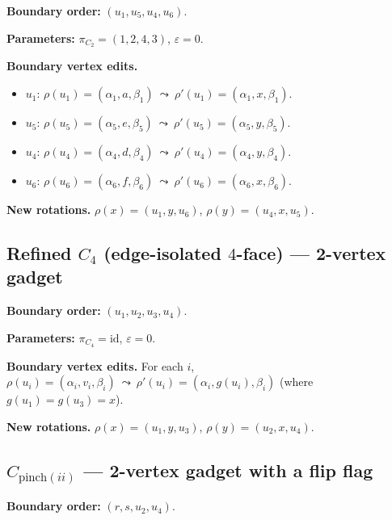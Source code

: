 \documentclass[12pt]{article}
\theoremstyle{definition}
\newcommand{\RefinedCFourGadgetVertices}{2}
\newcommand{\PinchGadgetVertices}{2}
\begin{document}
\noindent\textbf{Boundary order:} $(u_1, u_5, u_4, u_6)$.

\noindent\textbf{Parameters:} $\pi_{C_2} = (1, 2, 4, 3)$, $\varepsilon = 0$.

\medskip
\noindent\textbf{Boundary vertex edits.}
\begin{itemize}
  \item $u_1$: $\rho(u_1)=(\alpha_1, a, \beta_1)\ \leadsto\ \rho'(u_1)=(\alpha_1, x, \beta_1)$.
  \item $u_5$: $\rho(u_5)=(\alpha_5, e, \beta_5)\ \leadsto\ \rho'(u_5)=(\alpha_5, y, \beta_5)$.
  \item $u_4$: $\rho(u_4)=(\alpha_4, d, \beta_4)\ \leadsto\ \rho'(u_4)=(\alpha_4, y, \beta_4)$.
  \item $u_6$: $\rho(u_6)=(\alpha_6, f, \beta_6)\ \leadsto\ \rho'(u_6)=(\alpha_6, x, \beta_6)$.
\end{itemize}

\medskip
\noindent\textbf{New rotations.} $\rho(x) = (u_1,y,u_6)$, $\rho(y) = (u_4,x,u_5)$.



\subsection{Refined $C_4$ (edge-isolated $4$-face) --- \RefinedCFourGadgetVertices-vertex gadget}
\label{app:rot-refinedc4}

\noindent\textbf{Boundary order:} $(u_1, u_2, u_3, u_4)$.

\noindent\textbf{Parameters:} $\pi_{C_4} = \mathrm{id}$, $\varepsilon = 0$.

\medskip
\noindent\textbf{Boundary vertex edits.}
For each $i$, $\rho(u_i)=(\alpha_i, v_i, \beta_i)\ \leadsto\ \rho'(u_i)=(\alpha_i, g(u_i), \beta_i)$ (where $g(u_1)=g(u_3)=x$).

\medskip
\noindent\textbf{New rotations.} $\rho(x)=(u_1,y,u_3)$, $\rho(y)=(u_2,x,u_4)$.



\subsection{$C_{\mathrm{pinch}(ii)}$ --- \PinchGadgetVertices-vertex gadget with a flip flag}
\label{app:rot-pinch}

\noindent\textbf{Boundary order:} $(r, s, u_2, u_4)$.
\end{document}
